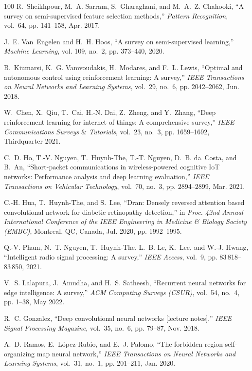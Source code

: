 \documentclass[journal]{IEEEtran}
\begin{document}
\begin{thebibliography}{100}
	R.~Sheikhpour, M.~A. Sarram, S.~Gharaghani, and M.~A.~Z. Chahooki, ``A survey
	on semi-supervised feature selection methods,'' \emph{Pattern Recognition},
	vol.~64, pp. 141--158, Apr. 2017.
	
	J.~E. Van~Engelen and H.~H. Hoos, ``A survey on semi-supervised learning,''
	\emph{Machine Learning}, vol. 109, no.~2, pp. 373--440, 2020.
	
	B.~Kiumarsi, K.~G. Vamvoudakis, H.~Modares, and F.~L. Lewis, ``Optimal and
	autonomous control using reinforcement learning: A survey,'' \emph{IEEE
		Transactions on Neural Networks and Learning Systems}, vol.~29, no.~6, pp.
	2042--2062, Jun. 2018.
	
	W.~Chen, X.~Qiu, T.~Cai, H.-N. Dai, Z.~Zheng, and Y.~Zhang, ``Deep
	reinforcement learning for internet of things: A comprehensive survey,''
	\emph{IEEE Communications Surveys $\&$ Tutorials}, vol.~23, no.~3, pp.
	1659--1692, Thirdquarter 2021.
	
	C.~D. Ho, T.-V. Nguyen, T.~Huynh-The, T.-T. Nguyen, D.~B. da~Costa, and B.~An,
	``Short-packet communications in wireless-powered cognitive {IoT} networks:
	Performance analysis and deep learning evaluation,'' \emph{IEEE Transactions
		on Vehicular Technology}, vol.~70, no.~3, pp. 2894--2899, Mar. 2021.
	
	C.-H. Hua, T.~Huynh-The, and S.~Lee, ``Dran: Densely reversed attention based
	convolutional network for diabetic retinopathy detection,'' in \emph{Proc.
		42nd Annual International Conference of the IEEE Engineering in Medicine \&
		Biology Society (EMBC)}, Montreal, QC, Canada, Jul. 2020, pp. 1992--1995.
	
	Q.-V. Pham, N.~T. Nguyen, T.~Huynh-The, L.~B. Le, K.~Lee, and W.-J. Hwang,
	``Intelligent radio signal processing: A survey,'' \emph{IEEE Access},
	vol.~9, pp. 83\,818--83\,850, 2021.
	
	V.~S. Lalapura, J.~Amudha, and H.~S. Satheesh, ``Recurrent neural networks for
	edge intelligence: A survey,'' \emph{ACM Computing Surveys (CSUR)}, vol.~54,
	no.~4, pp. 1--38, May 2022.
	
	R.~C. Gonzalez, ``Deep convolutional neural networks [lecture notes],''
	\emph{IEEE Signal Processing Magazine}, vol.~35, no.~6, pp. 79--87, Nov.
	2018.
	
	A.~D. Ramos, E.~L{\'o}pez-Rubio, and E.~J. Palomo, ``The forbidden region
	self-organizing map neural network,'' \emph{IEEE Transactions on Neural
		Networks and Learning Systems}, vol.~31, no.~1, pp. 201--211, Jan. 2020.
	

\end{thebibliography}
\end{document}
